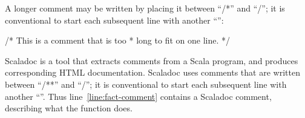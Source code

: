 

A longer comment may be written
by placing it between ``{\scalastyle\rm /*}'' and ``{\scalastyle\rm */}''; it is
conventional to start each subsequent line with another 
``{\scalastyle\rm *}'':
\begin{scala}
  /* This is a comment that is too
   * long to fit on one line. */
\end{scala}

Scaladoc is a tool that extracts comments from a Scala
program, and produces corresponding HTML documentation.  Scaladoc uses
comments that are written between ``{\scalastyle\rm /**}'' and
``{\scalastyle\rm */}''; it is conventional to start each subsequent line with
another ``{\scalastyle\rm *}''.  Thus line~\ref{line:fact-comment} contains a
Scaladoc comment, describing what the function does.

%








